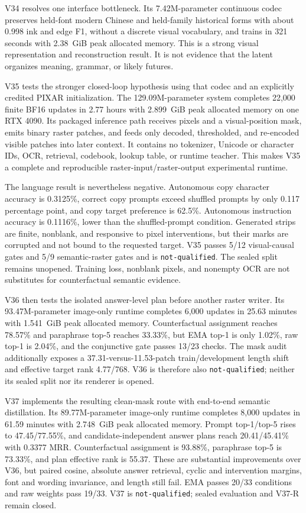 \documentclass[11pt]{article}
\begin{document}
V34 resolves one interface bottleneck. Its 7.42M-parameter continuous codec
preserves held-font modern Chinese and held-family historical forms with about
0.998 ink and edge F1, without a discrete visual vocabulary, and trains in
321 seconds with 2.38~GiB peak allocated memory. This is a strong visual
representation and reconstruction result. It is not evidence that the latent
organizes meaning, grammar, or likely futures.

V35 tests the stronger closed-loop hypothesis using that codec and an explicitly
credited PIXAR initialization. The 129.09M-parameter system completes 22,000
finite BF16 updates in 2.77 hours with 2.899~GiB peak allocated memory on one
RTX 4090. Its packaged inference path receives pixels and a visual-position
mask, emits binary raster patches, and feeds only decoded, thresholded, and
re-encoded visible patches into later context. It contains no tokenizer,
Unicode or character IDs, OCR, retrieval, codebook, lookup table, or runtime
teacher. This makes V35 a complete and reproducible raster-input/raster-output
experimental runtime.

The language result is nevertheless negative. Autonomous copy character
accuracy is 0.3125\%, correct copy prompts exceed shuffled prompts by only
0.117 percentage point, and copy target preference is 62.5\%. Autonomous
instruction accuracy is 0.1116\%, lower than the shuffled-prompt condition.
Generated strips are finite, nonblank, and responsive to pixel interventions,
but their marks are corrupted and not bound to the requested target. V35 passes
5/12 visual-causal gates and 5/9 semantic-raster gates and is
\texttt{not-qualified}. The sealed split remains unopened. Training loss,
nonblank pixels, and nonempty OCR are not substitutes for counterfactual
semantic evidence.

V36 then tests the isolated answer-level plan before another raster writer. Its
93.47M-parameter image-only runtime completes 6,000 updates in 25.63 minutes
with 1.541~GiB peak allocated memory. Counterfactual assignment reaches
78.57\% and paraphrase top-5 reaches 33.33\%, but EMA top-1 is only 1.02\%,
raw top-1 is 2.04\%, and the conjunctive gate passes 13/23 checks. The mask
audit additionally exposes a 37.31-versus-11.53-patch train/development length
shift and effective target rank 4.77/768. V36 is therefore also
\texttt{not-qualified}; neither its sealed split nor its renderer is opened.

V37 implements the resulting clean-mask route with end-to-end semantic
distillation. Its 89.77M-parameter image-only runtime completes 8,000 updates in
61.59 minutes with 2.748~GiB peak allocated memory. Prompt top-1/top-5 rises
to 47.45/77.55\%, and candidate-independent answer plans reach
20.41/45.41\% with 0.3377 MRR. Counterfactual assignment is 93.88\%,
paraphrase top-5 is 73.33\%, and plan effective rank is 55.37. These are
substantial improvements over V36, but paired cosine, absolute answer
retrieval, cyclic and intervention margins, font and wording invariance, and
length still fail. EMA passes 20/33 conditions and raw weights pass 19/33.
V37 is \texttt{not-qualified}; sealed evaluation and V37-R remain closed.
\end{document}
